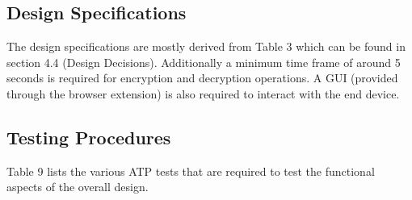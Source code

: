 \subsection{Design Specifications}
The design specifications are mostly derived from Table 3 which can be found in section 4.4 (Design Decisions). Additionally a minimum time frame of around 5 seconds is required for encryption and decryption operations. A GUI (provided through the browser extension) is also required to interact with the end device.

\subsection{Testing Procedures}
Table 9 lists the various ATP tests that are required to test the functional aspects of the overall design. 

